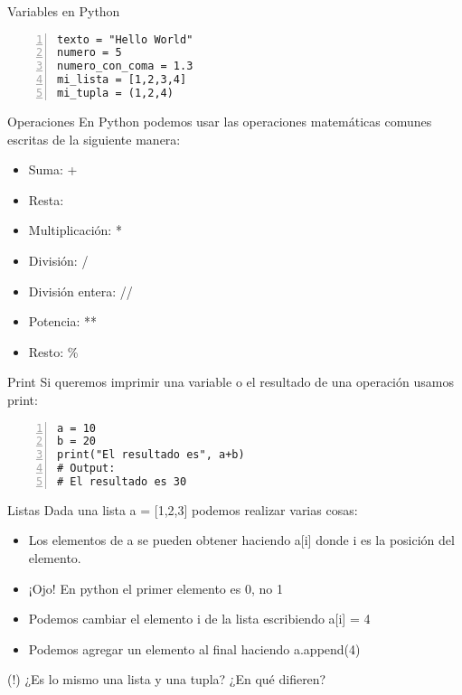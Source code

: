 \documentclass{beamer}
\begin{document}
\begin{frame}[fragile]{Variables en Python}
\begin{lstlisting}[numbers=left, numbersep=5pt]
texto = "Hello World"
numero = 5
numero_con_coma = 1.3
mi_lista = [1,2,3,4]
mi_tupla = (1,2,4)
\end{lstlisting}
\end{frame}

\begin{frame}{Operaciones}  
En Python podemos usar las operaciones matemáticas comunes escritas de la siguiente manera:

\begin{itemize}
    \item Suma: +
    \item Resta: \-
    \item Multiplicación: *
    \item División: /
    \item División entera: //
    \item Potencia: **
    \item Resto: \%
\end{itemize}
\end{frame}

\begin{frame}[fragile]{Print}
Si queremos imprimir una variable o el resultado de una operación usamos print:
\begin{lstlisting}[numbers=left, numbersep=5pt]
a = 10
b = 20
print("El resultado es", a+b)
# Output:
# El resultado es 30
\end{lstlisting}
\end{frame}

\begin{frame}{Listas}
Dada una lista a = [1,2,3] podemos realizar varias cosas:

\begin{itemize}
    \item Los elementos de a se pueden obtener haciendo a[i] donde i es la posición del elemento.
    \item ¡Ojo! En python el primer elemento es 0, no 1
    \item Podemos cambiar el elemento i de la lista escribiendo a[i] = 4
    \item Podemos agregar un elemento al final haciendo a.append(4)
\end{itemize}
\alert{(!) ¿Es lo mismo una lista y una tupla? ¿En qué difieren?}
\end{frame}
\end{document}
